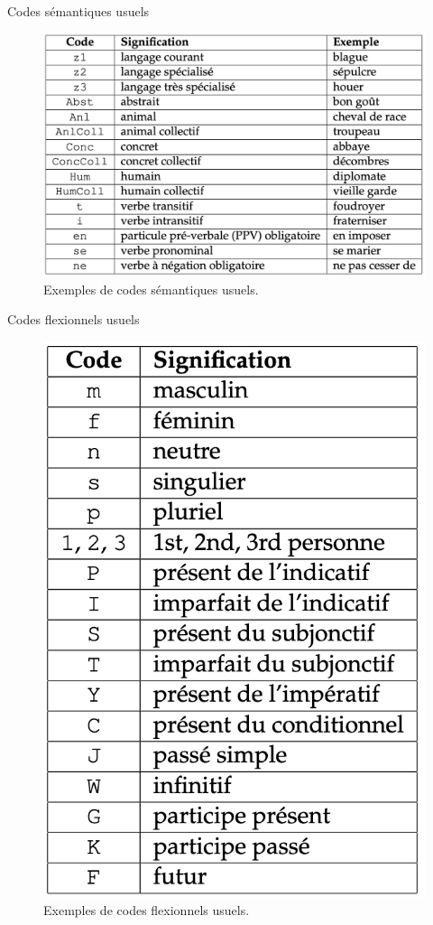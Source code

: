 \documentclass[xetex,xcolor={table,usenames,dvipsnames}]{beamer}
\begin{document}
\begin{frame}{Codes sémantiques usuels}
	\begin{figure}[h] %
		\centering
		\includegraphics[width=1\linewidth]{img/codes_semantiques.png}
		\caption{Exemples de codes sémantiques usuels.}
		\label{fig:ling_out_TAL}
	\end{figure}
\end{frame}

\begin{frame}{Codes flexionnels usuels}
	\begin{figure}[h] %
		\centering
		\includegraphics[width=.43\linewidth]{img/codes_flexionnels.png}
		\caption{Exemples de codes flexionnels usuels.}
		\label{fig:ling_out_TAL}
	\end{figure}
\end{frame}
\end{document}
